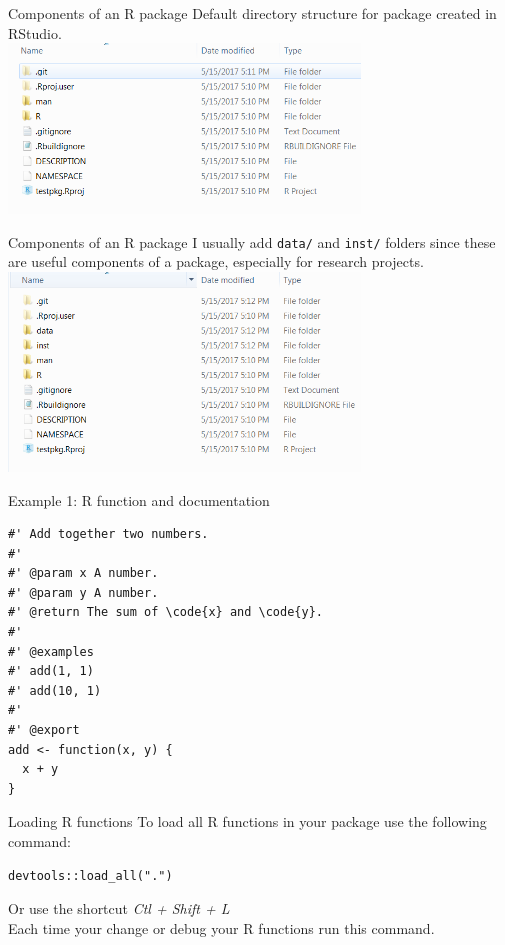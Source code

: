 \documentclass{beamer}
\begin{document}
\begin{frame}{Components of an R package}
Default directory structure for package created in RStudio.\\
\vspace{3ex}
\centering
\includegraphics[width=0.7\textwidth]{figure/pkg1.png}
\end{frame}

\begin{frame}{Components of an R package}
I usually add \texttt{data/} and \texttt{inst/} folders since these are useful components of a package, especially for research projects.\\
\vspace{3ex}
\centering
\includegraphics[width=0.7\textwidth]{figure/pkg2.png}
\end{frame}

\begin{frame}[fragile]{Example 1: R function and documentation}
\begin{verbatim}
#' Add together two numbers.
#'
#' @param x A number.
#' @param y A number.
#' @return The sum of \code{x} and \code{y}.
#'
#' @examples
#' add(1, 1)
#' add(10, 1)
#'
#' @export
add <- function(x, y) {
  x + y
}
\end{verbatim}
\end{frame}

\begin{frame}[fragile]{Loading R functions}
To load all R functions in your package use the following command:
\begin{verbatim}
devtools::load_all(".")
\end{verbatim}
Or use the shortcut \emph{Ctl + Shift + L}\\
\vspace{2ex}
Each time your change or debug your R functions run this command.\\
\end{frame}
\end{document}
